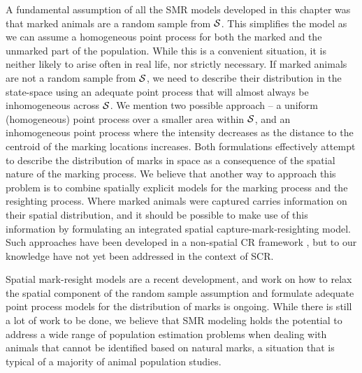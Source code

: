 A fundamental assumption of all the SMR models developed in this
chapter was that marked animals are a random sample from ${\cal
  S}$. This simplifies the model as we can assume a homogeneous point
process for both the marked and the unmarked part of the
population. While this is a convenient situation, it is neither likely
to arise often in real life, nor strictly necessary.  If marked
animals are not a random sample from ${\cal S}$, we need to describe
their distribution in the state-space using an adequate point process
that will almost always be inhomogeneous across ${\cal S}$.  We
mention two possible approach -- a uniform (homogeneous) point process
over a smaller area within ${\cal S}$, and an inhomogeneous point process
where the intensity decreases as the distance to the centroid of the 
marking locations increases.  
Both formulations effectively attempt to describe the distribution of
marks in space as a consequence of the spatial nature of the marking
process. We believe that another way to approach this problem is to
combine spatially explicit models for the marking process and the
resighting process. Where marked animals were captured carries
information on their spatial distribution, and it should be possible
to make use of this information by formulating an integrated spatial
capture-mark-resighting model. Such approaches have been developed in
a non-spatial CR framework \citep{matechou_etal:2013,
  pledger_etal:2009}, but to our knowledge have not yet been addressed
in the context of SCR.

 Spatial mark-resight models are a recent
development, and work on how to relax the spatial component of the
random sample assumption and formulate adequate point process models for the distribution of marks is ongoing. While there is still a lot of work to be done, we believe that SMR modeling holds the
potential to address a wide range of population estimation problems
when dealing with animals that cannot be identified based on natural
marks, a situation that is typical of a majority of animal population
studies.



